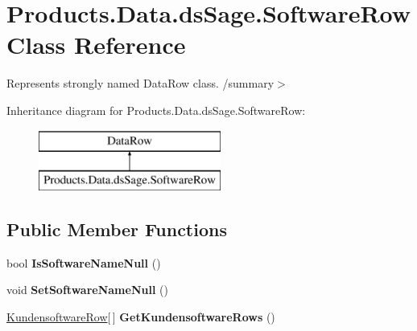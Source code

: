 \hypertarget{class_products_1_1_data_1_1ds_sage_1_1_software_row}{}\section{Products.\+Data.\+ds\+Sage.\+Software\+Row Class Reference}
\label{class_products_1_1_data_1_1ds_sage_1_1_software_row}


Represents strongly named Data\+Row class. /summary$>$  


Inheritance diagram for Products.\+Data.\+ds\+Sage.\+Software\+Row\+:\begin{figure}[H]
\begin{center}
\leavevmode
\includegraphics[height=2.000000cm]{class_products_1_1_data_1_1ds_sage_1_1_software_row}
\end{center}
\end{figure}
\subsection*{Public Member Functions}
\begin{DoxyCompactItemize}
\item 
bool {\bfseries Is\+Software\+Name\+Null} ()\hypertarget{class_products_1_1_data_1_1ds_sage_1_1_software_row_a1482e12fefc0dbff47337ab693f8bfab}{}\label{class_products_1_1_data_1_1ds_sage_1_1_software_row_a1482e12fefc0dbff47337ab693f8bfab}

\item 
void {\bfseries Set\+Software\+Name\+Null} ()\hypertarget{class_products_1_1_data_1_1ds_sage_1_1_software_row_a67b83979bd39babdb4f54191087836bd}{}\label{class_products_1_1_data_1_1ds_sage_1_1_software_row_a67b83979bd39babdb4f54191087836bd}

\item 
\hyperlink{class_products_1_1_data_1_1ds_sage_1_1_kundensoftware_row}{Kundensoftware\+Row}\mbox{[}$\,$\mbox{]} {\bfseries Get\+Kundensoftware\+Rows} ()\hypertarget{class_products_1_1_data_1_1ds_sage_1_1_software_row_ad78c3e28135d3b862aa69205a8d3ddc4}{}\label{class_products_1_1_data_1_1ds_sage_1_1_software_row_ad78c3e28135d3b862aa69205a8d3ddc4}

\end{DoxyCompactItemize}
